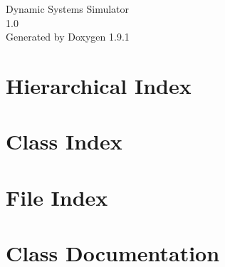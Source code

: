 \let\mypdfximage\pdfximage\def\pdfximage{\immediate\mypdfximage}\documentclass[twoside]{book}
\newcommand{\+}{\discretionary{\mbox{\scriptsize$\hookleftarrow$}}{}{}}
\newcommand{\clearemptydoublepage}{%
  \newpage{\pagestyle{empty}\cleardoublepage}%
}
\begin{document}
\raggedbottom

\hypersetup{pageanchor=false,
             bookmarksnumbered=true,
             pdfencoding=unicode
            }
\begin{titlepage}
\vspace*{7cm}
\begin{center}%
{\Large Dynamic Systems Simulator \\[1ex]\large 1.\+0 }\\
\vspace*{1cm}
{\large Generated by Doxygen 1.9.1}\\
\end{center}
\end{titlepage}
\clearemptydoublepage
{}
\tableofcontents
\clearemptydoublepage
{}
\hypersetup{pageanchor=true}

\chapter{Hierarchical Index}

\chapter{Class Index}

\chapter{File Index}

\chapter{Class Documentation}

























\end{document}
